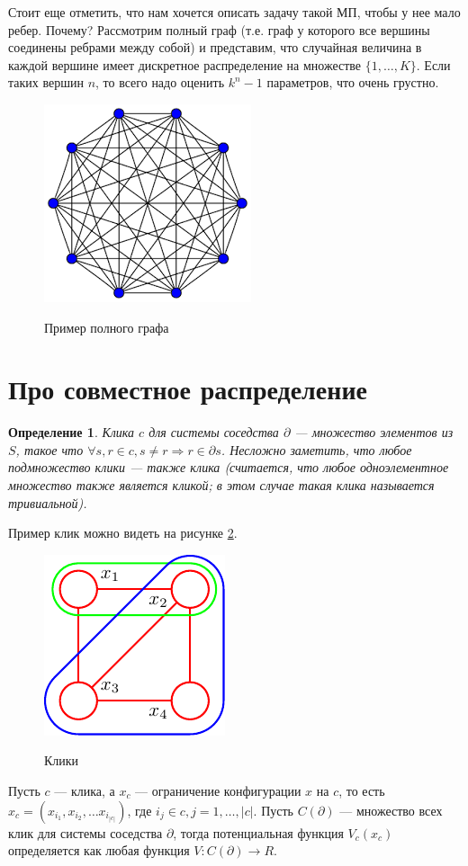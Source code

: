 \documentclass[12pt]{article}
\newtheorem{dfn}{Определение}
\begin{document}
Стоит еще отметить, что нам хочется описать задачу такой МП, чтобы у нее мало ребер. Почему? 
Рассмотрим полный граф (т.е. граф у которого все вершины соединены ребрами между собой) и представим, что случайная величина в каждой вершине имеет дискретное распределение на множестве $\{ 1, \ldots, K \}$. Если таких вершин $n$, то всего надо оценить $k^n - 1$ параметров, что очень грустно. 
\begin{figure}[h!]
\centering
\includegraphics[width=.3\linewidth]{./figures/full.png}
\label{fig:hmm}
\caption{Пример полного графа}
\end{figure}


\section{Про совместное распределение}

\begin{dfn}
Клика $c$ для системы соседства $\partial$ --- множество элементов из $S$,  такое что $\forall s, r \in c, s \ne r \Rightarrow r \in \partial s$. Несложно заметить,
что любое подмножество клики --- также клика (считается, что любое одноэлементное множество также является кликой; в этом случае такая клика называется тривиальной). 
\end{dfn}
Пример клик можно видеть на рисунке \ref{fig:cliques}.

\begin{figure}[hh]
\centering
\includegraphics[width=.3\linewidth]{./figures/cliques.pdf}
\label{fig:cliques}
\caption{Клики}
\end{figure}

Пусть $c$ --- клика, а $x_c$ --- ограничение конфигурации $x$ на $c$, то есть $x_c = (x_{i_1}, x_{i_2}, \ldots x_{i_{|c|}})$, где $i_j \in c, j = 1, \ldots, |c|$. Пусть $C(\partial)$ --- множество всех клик для системы соседства $\partial$, тогда потенциальная функция $V_c(x_c)$ определяется как любая функция $V : C(\partial) \rightarrow R$.
\end{document}
